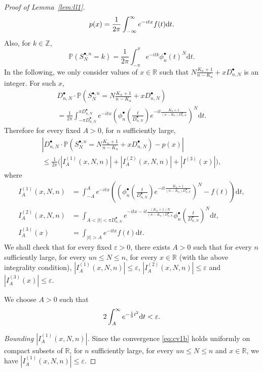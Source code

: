 \documentclass[10pt]{amsart}
\theoremstyle{definition}\newtheorem{defi}[theo]{Definition}\newtheorem{rema}[theo]{Remark}\newtheorem{exam}[theo]{Example}\newtheorem{exem}[theo]{Example}\newtheorem{nota}[theo]{Notation}
\newcommand{\R}{\mathbb{R}}
\def\d{{\rm d}}
\def\Sbn{S^{\bullet,n}}
\def\phibn{\phi^{\bullet}_{n}}
\def\DbnN{D^{\bullet}_{n,N}}
\renewcommand{\epsilon}{\varepsilon}
\renewcommand\Pr[1]{\mathbb{P}\left(#1\right)}
\begin{document}
\begin{proof}[Proof of Lemma~\ref{lem:ll1}]
\begin{equation}
 \label{eq:fourierb}  p(x)= \frac{1}{2\pi} \int_{-\infty}^{\infty} e^{-itx} f(t) {\d}t.
 \end{equation}
Also, for $k \in \mathbb{Z}$,
\[ \Pr{\Sbn_{N}=k} = \frac{1}{2\pi} \int_{-\pi}^{\pi} e^{-itk} \phibn(t)^{ N} {\mathrm{d}}t.\]
In the following, we only consider values of $x \in \R$ such that $N \frac{K_{n}+1}{n-K_{n}}+x  \DbnN$ is an integer.
For such $x$,
\begin{multline*}
  \DbnN \cdot \Pr{\Sbn_{ N}= N \frac{K_{n}+1}{n-K_{n}}+x  \DbnN}\\
  =  \frac{1}{2\pi} \int^{\pi \DbnN}_{-\pi \DbnN} e^{- i t x} \left(  \phibn \left(  \frac{t}{\DbnN} \right)   e^{-it \frac{K_{n}+1}{(n-K_{n}) \DbnN}} \right)^{N} {\mathrm{d}}t.
\end{multline*}
Therefore for every fixed $A>0$, for $n$ sufficiently large,
\begin{multline*}
  \left| \DbnN \cdot \Pr{\Sbn_{N}= N \frac{K_{n}+1}{n-K_{n}}+x  \DbnN} -p( x)\right| \\
  \leq \frac{1}{2 \pi} \big(|I^{(1)}_{A}(x,N,n)| + |I^{(2)}_{A}(x,N,n)|+|I^{(3)}(x)|\big),
\end{multline*}
where
\begin{align*}
  I^{(1)}_{A}(x,N,n)&=\int_{-A}^{A} e^{-i t x} \left(   \left(  \phibn \left(  \frac{t}{\DbnN} \right)   e^{-it \frac{K_{n}+1}{(n-K_{n}) \DbnN}} \right)^{N}- f(t) \right) {\mathrm{d}}t,\\
 I^{(2)}_{A}(x,N,n)&= \int_{A<|t|< \pi \DbnN} e^{-itx - it \frac{(K_{n}+1) N}{(n-K_{n}) \DbnN}} \phibn \left(  \frac{t}{\DbnN} \right) ^{ N}{\mathrm{d}}t, \\
 I^{(3)}_{A}(x)&= \int_{|t|>A} e^{-itx} f(t) {\mathrm{d}}t.
 \end{align*}
We shall check that for every fixed $\epsilon>0$, there exists $A>0$ such that for every $n$ sufficiently large, for every $ un \leq N \leq  n$, for every $x \in \R$ (with the above integrality condition),  $|I^{(1)}_{A}(x,N,n)| \leq \epsilon$, $|I^{(2)}_{A}(x,N,n)| \leq \epsilon$ and $|I^{(3)}_{A}(x)| \leq\epsilon$.



 We choose $A >0$ such that
\begin{equation}
\label{eq:Ab} 2 \int_{A}^{\infty } e^{-  \frac{1}{9} t^{2}} {\d}t < \epsilon.
\end{equation}


\emph{Bounding $|I^{(1)}_{A}(x,N,n)|$.} Since the convergence \eqref{eq:cv1b} holds  uniformly on compact subsets of $\R$, for   $n$ sufficiently large, for every $ un \leq N \leq n$ and $x \in \R$, we have $|I^{(1)}_{A}(x,N,n)| \leq \epsilon$.


\end{proof}
\end{document}
